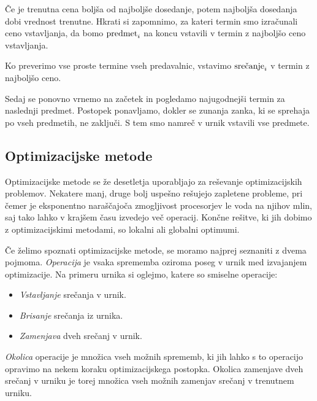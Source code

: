 \documentclass[10pt, a4paper]{article}
\begin{document}
   Če je trenutna cena boljša od najboljše dosedanje, potem najboljša dosedanja
   dobi vrednost trenutne. Hkrati si zapomnimo, za kateri termin smo izračunali ceno
   vstavljanja, da bomo $\textnormal{predmet}_i$ na koncu vstavili v termin z najboljšo
   ceno vstavljanja.

   Ko preverimo vse proste termine vseh predavalnic, vstavimo $\textnormal{srečanje}_i$
   v termin z najboljšo ceno.

   Sedaj se ponovno vrnemo na začetek in pogledamo najugodnejši termin za naslednji
   predmet. Postopek ponavljamo, dokler se zunanja zanka, ki se sprehaja po vseh predmetih,
   ne zaključi. S tem smo namreč v urnik vstavili vse predmete.

\subsection{Optimizacijske metode}

Optimizacijske metode se že desetletja uporabljajo za reševanje optimizacijskih problemov.
Nekatere manj, druge bolj uspešno rešujejo zapletene probleme, pri čemer je eksponentno
naraščajoča zmogljivost procesorjev le voda na njihov mlin, saj tako lahko v krajšem
času izvedejo več operacij. Končne rešitve, ki jih dobimo z optimizacijskimi metodami,
so lokalni ali globalni optimumi.

Če želimo spoznati optimizacijske metode, se moramo najprej seznaniti z dvema pojmoma.
\emph{Operacija} je vsaka sprememba oziroma poseg v urnik med izvajanjem optimizacije.
Na primeru urnika si oglejmo, katere so smiselne operacije:

\begin{itemize}
   \item \emph{Vstavljanje} srečanja v urnik.
   \item \emph{Brisanje} srečanja iz urnika.
  \item \emph{Zamenjava} dveh srečanj v urnik.
\end{itemize}

\noindent \emph{Okolica} operacije je množica vseh možnih sprememb, ki jih lahko s to operacijo
opravimo na nekem koraku optimizacijskega postopka. Okolica zamenjave dveh srečanj v urniku
je torej množica vseh možnih zamenjav srečanj v trenutnem urniku.
\end{document}
